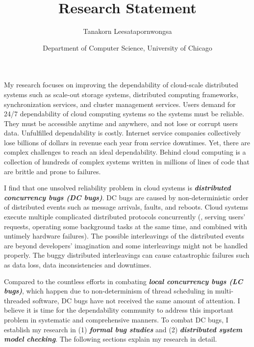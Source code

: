 \documentclass[11pt]{article}
\begin{document}
\title{Research Statement}
\author{Tanakorn Leesatapornwongsa}
\date{\vspace{-1ex} \small{Department of Computer Science, University of
Chicago}}

\maketitle

My research focuses on improving the dependability of cloud-scale distributed
systems such as scale-out storage systems, distributed computing frameworks,
synchronization services, and cluster management services. Users demand for
24/7 dependability of cloud computing systems so the systems must be reliable.
They must be accessible anytime and anywhere, and not lose or corrupt users
data. Unfulfilled dependability is costly. Internet service companies
collectively lose billions of dollars in revenue each year from service
downtimes. Yet, there are complex challenges to reach an ideal dependability.
Behind cloud computing is a collection of hundreds of complex systems written in
millions of lines of code that are brittle and prone to failures.

I find that one unsolved reliability problem in cloud systems is
\textbf{\textit{distributed concurrency bugs (DC bugs)}}. DC bugs are caused by
non-deterministic order of distributed events such as message arrivals, faults,
and reboots. Cloud systems execute multiple complicated distributed protocols
concurrently (\eg, serving users' requests, operating some background tasks at
the same time, and combined with untimely hardware failures). The possible
interleavings of the distributed events are beyond developers' imagination and
some interleavings might not be handled properly. The buggy distributed
interleavings can cause catastrophic failures such as data loss, data
inconsistencies and downtimes. 

Compared to the countless efforts in combating \textbf{\textit{local concurrency
bugs (LC bugs)}}, which happen due to non-determinism of thread scheduling in
multi-threaded software, DC bugs have not received the same amount of attention.
I believe it is time for the dependability community to address this important
problem in systematic and comprehensive manners.  To combat DC bugs, I establish
my research in (1) \textbf{\textit{formal bug studies}} and (2)
\textbf{\textit{distributed system model checking}}. The following sections
explain my research in detail.
\end{document}
